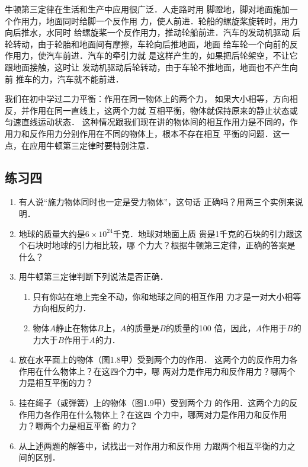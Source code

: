 牛顿第三定律在生活和生产中应用很广泛．人走路时用
脚蹬地，脚对地面施加一个作用力，地面同时给脚一个反作用
力，使人前进．轮船的螺旋桨旋转时，用力向后推水，水同时
给螺旋桨一个反作用力，推动轮船前进．汽车的发动机驱动
后轮转动，由于轮胎和地面间有摩擦，车轮向后推地面，地面
给车轮一个向前的反作用力，使汽车前进．汽车的牵引力就
是这样产生的，如果把后轮架空，不让它跟地面接触，这时让
发动机驱动后轮转动，由于车轮不推地面，地面也不产生向前
推车的力，汽车就不能前进．

    我们在初中学过二力平衡：作用在同一物体上的两个力，
如果大小相等，方向相反，并作用在同一直线上，这两个力就
互相平衡，物体就保持原来的静止状态或匀速直线运动状态．
这种情况跟我们现在讲的物体间的相互作用力是不同的，作
用力和反作用力分别作用在不同的物体上，根本不存在相互
平衡的问题．这一点，在应用牛顿第三定律时要特别注意．


\subsection*{练习四}
\begin{enumerate}
\item  有人说“施力物体同时也一定是受力物体”，这句话
正确吗？用两三个实例来说明．

\item  地球的质量大约是$6\times 10^{24}$千克．地球对地面上质
贵是1千克的石块的引力跟这个石块时地球的引力相比较，哪
个力大？根据牛顿第三定律，正确的答案是什么？

\item  用牛顿第三定律判断下列说法是否正确．
\begin{enumerate}
\item  只有你站在地上完全不动，你和地球之间的相互作用
力才是一对大小相等方向相反的力．
\item  物体$A$静止在物体$B$上，$A$的质量是$B$的质量的100
倍，因此，$A$作用于$B$的力大于$B$作用于$A$的力．
\end{enumerate}

\item  放在水平面上的物体（图1.8甲）受到两个力的作用．
这两个力的反作用力各作用在什么物体上？在这四个力中，哪
两对力是作用力和反作用力？哪两个力是相互平衡的力？
\item  挂在绳子（或弹簧）上的物体（图1.9甲）受到两个力
的作用．这两个力的反作用力各作用在什么物体上？在这四
个力中，哪两对力是作用力和反作用力？哪两个力是相互平衡
的力？
\item 从上述两题的解答中，试找出一对作用力和反作用
力跟两个相互平衡的力之间的区别．

\end{enumerate}

